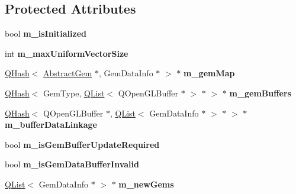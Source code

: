 \subsection*{Protected Attributes}
\begin{DoxyCompactItemize}
\item 
\hypertarget{class_gem_renderer_abedb030e36a36f2faa096727bfdd226d}{}bool {\bfseries m\+\_\+is\+Initialized}\label{class_gem_renderer_abedb030e36a36f2faa096727bfdd226d}

\item 
\hypertarget{class_gem_renderer_a3ed9c37e253feb54b1ca0e34d51751a9}{}int {\bfseries m\+\_\+max\+Uniform\+Vector\+Size}\label{class_gem_renderer_a3ed9c37e253feb54b1ca0e34d51751a9}

\item 
\hypertarget{class_gem_renderer_a549290c95d8ca95b163ca0fae08e11c8}{}\hyperlink{class_q_hash}{Q\+Hash}$<$ \hyperlink{class_abstract_gem}{Abstract\+Gem} $\ast$, Gem\+Data\+Info $\ast$ $>$ $\ast$ {\bfseries m\+\_\+gem\+Map}\label{class_gem_renderer_a549290c95d8ca95b163ca0fae08e11c8}

\item 
\hypertarget{class_gem_renderer_af64c5f2973d7c025dc011bc64fb93e50}{}\hyperlink{class_q_hash}{Q\+Hash}$<$ Gem\+Type, \hyperlink{class_q_list}{Q\+List}$<$ Q\+Open\+G\+L\+Buffer $\ast$ $>$ $\ast$ $>$ $\ast$ {\bfseries m\+\_\+gem\+Buffers}\label{class_gem_renderer_af64c5f2973d7c025dc011bc64fb93e50}

\item 
\hypertarget{class_gem_renderer_ace5a7e3d33bd65cbe78d2b395a83e27a}{}\hyperlink{class_q_hash}{Q\+Hash}$<$ Q\+Open\+G\+L\+Buffer $\ast$, \hyperlink{class_q_list}{Q\+List}$<$ Gem\+Data\+Info $\ast$ $>$ $\ast$ $>$ $\ast$ {\bfseries m\+\_\+buffer\+Data\+Linkage}\label{class_gem_renderer_ace5a7e3d33bd65cbe78d2b395a83e27a}

\item 
\hypertarget{class_gem_renderer_a1c7545294804fd500e8e02ce106bb6ba}{}bool {\bfseries m\+\_\+is\+Gem\+Buffer\+Update\+Required}\label{class_gem_renderer_a1c7545294804fd500e8e02ce106bb6ba}

\item 
\hypertarget{class_gem_renderer_aabd20f07edbe436be86c9b29d4e05fa8}{}bool {\bfseries m\+\_\+is\+Gem\+Data\+Buffer\+Invalid}\label{class_gem_renderer_aabd20f07edbe436be86c9b29d4e05fa8}

\item 
\hypertarget{class_gem_renderer_ab93df8610036b343cdd98be3cd328aed}{}\hyperlink{class_q_list}{Q\+List}$<$ Gem\+Data\+Info $\ast$ $>$ $\ast$ {\bfseries m\+\_\+new\+Gems}\label{class_gem_renderer_ab93df8610036b343cdd98be3cd328aed}


\end{DoxyCompactItemize}
